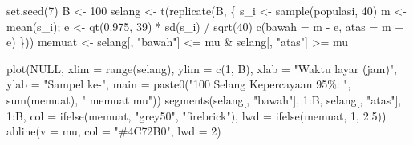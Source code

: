 \documentclass[
  indonesian,
  letterpaper,
]{book}
\newenvironment{Shaded}{\begin{snugshade}}{\end{snugshade}}
\newcommand{\AttributeTok}[1]{\textcolor[rgb]{0.40,0.45,0.13}{#1}}
\newcommand{\ConstantTok}[1]{\textcolor[rgb]{0.56,0.35,0.01}{#1}}
\newcommand{\DecValTok}[1]{\textcolor[rgb]{0.68,0.00,0.00}{#1}}
\newcommand{\FloatTok}[1]{\textcolor[rgb]{0.68,0.00,0.00}{#1}}
\newcommand{\FunctionTok}[1]{\textcolor[rgb]{0.28,0.35,0.67}{#1}}
\newcommand{\NormalTok}[1]{\textcolor[rgb]{0.00,0.23,0.31}{#1}}
\newcommand{\OtherTok}[1]{\textcolor[rgb]{0.00,0.23,0.31}{#1}}
\newcommand{\SpecialCharTok}[1]{\textcolor[rgb]{0.37,0.37,0.37}{#1}}
\newcommand{\StringTok}[1]{\textcolor[rgb]{0.13,0.47,0.30}{#1}}
\begin{document}
\begin{Shaded}
\begin{Highlighting}[]
\FunctionTok{set.seed}\NormalTok{(}\DecValTok{7}\NormalTok{)}
\NormalTok{B }\OtherTok{\textless{}{-}} \DecValTok{100}
\NormalTok{selang }\OtherTok{\textless{}{-}} \FunctionTok{t}\NormalTok{(}\FunctionTok{replicate}\NormalTok{(B, \{}
\NormalTok{  s\_i }\OtherTok{\textless{}{-}} \FunctionTok{sample}\NormalTok{(populasi, }\DecValTok{40}\NormalTok{)}
\NormalTok{  m }\OtherTok{\textless{}{-}} \FunctionTok{mean}\NormalTok{(s\_i); e }\OtherTok{\textless{}{-}} \FunctionTok{qt}\NormalTok{(}\FloatTok{0.975}\NormalTok{, }\DecValTok{39}\NormalTok{) }\SpecialCharTok{*} \FunctionTok{sd}\NormalTok{(s\_i) }\SpecialCharTok{/} \FunctionTok{sqrt}\NormalTok{(}\DecValTok{40}\NormalTok{)}
  \FunctionTok{c}\NormalTok{(}\AttributeTok{bawah =}\NormalTok{ m }\SpecialCharTok{{-}}\NormalTok{ e, }\AttributeTok{atas =}\NormalTok{ m }\SpecialCharTok{+}\NormalTok{ e)}
\NormalTok{\}))}
\NormalTok{memuat }\OtherTok{\textless{}{-}}\NormalTok{ selang[, }\StringTok{"bawah"}\NormalTok{] }\SpecialCharTok{\textless{}=}\NormalTok{ mu }\SpecialCharTok{\&}\NormalTok{ selang[, }\StringTok{"atas"}\NormalTok{] }\SpecialCharTok{\textgreater{}=}\NormalTok{ mu}

\FunctionTok{plot}\NormalTok{(}\ConstantTok{NULL}\NormalTok{, }\AttributeTok{xlim =} \FunctionTok{range}\NormalTok{(selang), }\AttributeTok{ylim =} \FunctionTok{c}\NormalTok{(}\DecValTok{1}\NormalTok{, B), }\AttributeTok{xlab =} \StringTok{"Waktu layar (jam)"}\NormalTok{, }\AttributeTok{ylab =} \StringTok{"Sampel ke{-}"}\NormalTok{,}
     \AttributeTok{main =} \FunctionTok{paste0}\NormalTok{(}\StringTok{"100 Selang Kepercayaan 95\%: "}\NormalTok{, }\FunctionTok{sum}\NormalTok{(memuat), }\StringTok{" memuat mu"}\NormalTok{))}
\FunctionTok{segments}\NormalTok{(selang[, }\StringTok{"bawah"}\NormalTok{], }\DecValTok{1}\SpecialCharTok{:}\NormalTok{B, selang[, }\StringTok{"atas"}\NormalTok{], }\DecValTok{1}\SpecialCharTok{:}\NormalTok{B,}
         \AttributeTok{col =} \FunctionTok{ifelse}\NormalTok{(memuat, }\StringTok{"grey50"}\NormalTok{, }\StringTok{"firebrick"}\NormalTok{), }\AttributeTok{lwd =} \FunctionTok{ifelse}\NormalTok{(memuat, }\DecValTok{1}\NormalTok{, }\FloatTok{2.5}\NormalTok{))}
\FunctionTok{abline}\NormalTok{(}\AttributeTok{v =}\NormalTok{ mu, }\AttributeTok{col =} \StringTok{"\#4C72B0"}\NormalTok{, }\AttributeTok{lwd =} \DecValTok{2}\NormalTok{)}
\end{Highlighting}
\end{Shaded}
\end{document}
